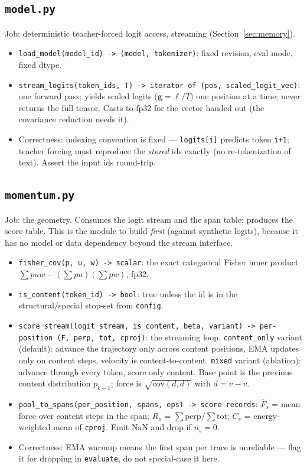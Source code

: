 \documentclass[11pt]{article}
\newcommand{\modu}[1]{\texttt{#1}}
\newcommand{\fn}[1]{\texttt{#1}}
\begin{document}
\subsection{\modu{model.py}}
Job: deterministic teacher-forced logit access, streaming (Section~\ref{sec:memory}).
\begin{itemize}[leftmargin=1.5em]
  \item \fn{load\_model(model\_id) -> (model, tokenizer)}: fixed revision, eval mode, fixed dtype.
  \item \fn{stream\_logits(token\_ids, T) -> iterator of (pos, scaled\_logit\_vec)}: one forward pass; yields scaled logits ($\bm{g}=\bm{\ell}/T$) one position at a time; never returns the full tensor. Casts to fp32 for the vector handed out (the covariance reduction needs it).
  \item Correctness: indexing convention is fixed --- \texttt{logits[i]} predicts token \texttt{i+1}; teacher forcing must reproduce the \emph{stored} ids exactly (no re-tokenization of text). Assert the input ids round-trip.
\end{itemize}

\subsection{\modu{momentum.py}}
\label{sec:momentum-mod}
Job: the geometry. Consumes the logit stream and the span table; produces the score table. This is the module to build \emph{first} (against synthetic logits), because it has no model or data dependency beyond the stream interface.
\begin{itemize}[leftmargin=1.5em]
  \item \fn{fisher\_cov(p, u, w) -> scalar}: the exact categorical Fisher inner product $\sum p u w - (\sum p u)(\sum p w)$, fp32.
  \item \fn{is\_content(token\_id) -> bool}: true unless the id is in the structural/special stop-set from \modu{config}.
  \item \fn{score\_stream(logit\_stream, is\_content, beta, variant) -> per-position (F, perp, tot, cproj)}: the streaming loop. \texttt{content\_only} variant (default): advance the trajectory only across content positions, EMA updates only on content steps, velocity is content-to-content. \texttt{mixed} variant (ablation): advance through every token, score only content. Base point is the previous content distribution $p_{k-1}$; force is $\sqrt{\mathrm{cov}(d,d)}$ with $d=v-\bar v$.
  \item \fn{pool\_to\_spans(per\_position, spans, eps) -> score records}: $\bar F_s$ = mean force over content steps in the span; $R_s$ = $\sum\text{perp}/\sum\text{tot}$; $C_s$ = energy-weighted mean of \texttt{cproj}. Emit NaN and drop if $n_s=0$.
  \item Correctness: EMA warmup means the first span per trace is unreliable --- flag it for dropping in \modu{evaluate}, do not special-case it here.
\end{itemize}
\end{document}
